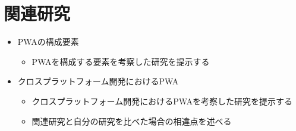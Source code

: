 \section{関連研究}\label{sec:関連研究}
\begin{itemize}
  \item PWAの構成要素
  \begin{itemize}
    \item PWAを構成する要素を考察した研究を提示する
  \end{itemize}
  \item クロスプラットフォーム開発におけるPWA
  \begin{itemize}
    \item クロスプラットフォーム開発におけるPWAを考察した研究を提示する
    \item 関連研究と自分の研究を比べた場合の相違点を述べる
  \end{itemize}
\end{itemize}
